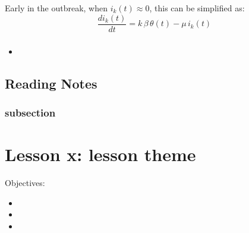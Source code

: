\documentclass[11pt]{scrartcl} %
\begin{document}
Early in the outbreak, when $i_k(t) \approx 0$, this can be simplified as: 
\[ \frac{di_k(t)}{dt} = k \, \beta \, \theta(t) - \mu \, i_k(t) \] 



\subsubsection{}
\subsubsection{}
\subsubsection{}

\paragraph{}

\textbf{}

\begin{itemize}
	\item 
\end{itemize}

\subsection{Reading Notes}

\subsubsection{subsection}
\textbf{}



\section{Lesson x: lesson theme}

Objectives:
\begin{itemize}
	\item 
	\item 
	\item 
\end{itemize}
\end{document}
